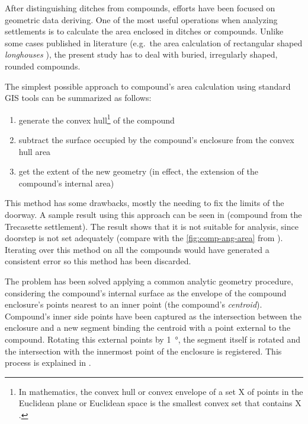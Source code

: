             After distinguishing ditches from compounds, efforts have been focused on geometric data deriving. One of the most useful operations when analyzing settlements is to calculate the area enclosed in ditches or compounds. Unlike some cases published in literature (e.g.\ the area calculation of rectangular shaped \emph{longhouses} \cite{spatial-south-europe}), the present study has to deal with buried, irregularly shaped, rounded compounds.

            The simplest possible approach to compound's area calculation using standard GIS tools can be summarized as follows:
            
            \begin{enumerate}
                \item generate the convex hull\footnote{In mathematics, the convex hull or convex envelope of a set X of points in the Euclidean plane or Euclidean space is the smallest convex set that contains X \cite{wiki:hull}.} of the compound
                \item subtract the surface occupied by the compound's enclosure from the convex hull area
                \item get the extent of the new geometry (in effect, the extension of the compound's internal area)
            \end{enumerate}

            This method has some drawbacks, mostly the needing to fix the limits of the doorway. A sample result using this approach can be seen in  (compound from the Trecasette settlement). The result shows that it is not suitable for analysis, since doorstep is not set adequately (compare  with the \ref{fig:comp-ang-area} from \cite{laterza}). Iterating over this method on all the compounds would have generated a consistent error so this method has been discarded.

            The problem has been solved applying a common analytic geometry procedure, considering the compound's internal surface as the envelope of the compound enclosure's points nearest to an inner point (the compound's \emph{centroid}). Compound's inner side points have been captured as the intersection between the enclosure and a new segment binding the centroid with a point external to the compound. Rotating this external points by \SI{1}{\degree}, the segment itself is rotated and the intersection with the innermost point of the enclosure is registered. This process is explained in .
            

